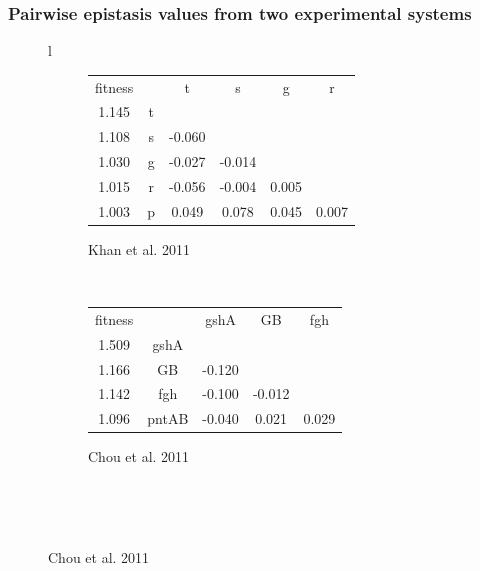 \documentclass[compress]{beamer}
\begin{document}
\begin{frame}
\frametitle{Pairwise epistasis values from two experimental systems}

\begin{figure}
\newcommand{\hlB}{\cellcolor{blue!20}}
\newcommand{\hlR}{\cellcolor{red!20}}
\hspace{1.35cm}
\begin{tabular}{l}
\begin{subfigure}[l]{0.5\textwidth}
\caption{Khan et al. 2011}
\begin{tabular}{cccccc}
fitness &   & t           & s           & g           & r           \\
1.145   & t &             &             &             &             \\
1.108   & s & \hlB -0.060 &             &             &             \\
1.030   & g & \hlB -0.027 & \hlB -0.014 &             &             \\
1.015   & r & \hlB -0.056 & \hlB -0.004 & \hlR 0.005  &             \\
1.003   & p & \hlR  0.049 & \hlR  0.078 & \hlR 0.045  & \hlR 0.007  \\
\end{tabular}
\end{subfigure}
\\
\begin{subfigure}[l]{0.5\textwidth}
\caption{Chou et al. 2011}
\begin{tabular}{ccccc}
fitness &       & gshA        & GB          & fgh         \\
1.509   & gshA  &             &             &             \\
1.166   & GB    & \hlB -0.120 &             &             \\
1.142   & fgh   & \hlB -0.100 & \hlB -0.012 &             \\
1.096   & pntAB & \hlB -0.040 & \hlR  0.021 & \hlR 0.029  \\
\end{tabular}
\end{subfigure}
\\
\end{tabular}
\hfill\
\end{figure}
\end{frame}

\end{document}
